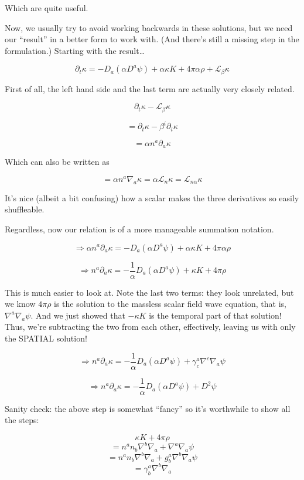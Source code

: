 \documentclass[landscape,letterpaper,10pt,english]{article}
\begin{document}
    Which are quite useful.

Now, we usually try to avoid working backwards in these solutions, but
we need our ``result'' in a better form to work with. (And there's still
a missing step in the formulation.) Starting with the result\ldots{}

\[ \partial_t \kappa = -D_a(\alpha D^a \psi) + \alpha \kappa K + 4\pi \alpha\rho + \mathcal{L}_\beta \kappa \]

First of all, the left hand side and the last term are actually very
closely related.

\[ \partial_t \kappa - \mathcal{L}_\beta \kappa \]

\[ = \partial_t \kappa - \beta^i \partial_i \kappa \]

\[ = \alpha n^a \partial_a \kappa \]

Which can also be written as

\[ = \alpha n^a \nabla_a \kappa = \alpha \mathcal{L}_n \kappa = \mathcal{L}_{n\alpha} \kappa\]

It's nice (albeit a bit confusing) how a scalar makes the three
derivatives so easily shuffleable.

    Regardless, now our relation is of a more manageable summation notation.

\[ \Rightarrow \alpha n^a \partial_a \kappa = -D_a(\alpha D^a \psi) + \alpha \kappa K + 4\pi \alpha\rho \]

\[ \Rightarrow n^a \partial_a \kappa = -\frac{1}{\alpha} D_a(\alpha D^a \psi) + \kappa K + 4 \pi \rho \]

This is much easier to look at. Note the last two terms: they look
unrelated, but we know \(4 \pi \rho\) is the solution to the massless
scalar field wave equation, that is, \(\nabla^a \nabla_a \psi\). And we
just showed that \(-\kappa K\) is the temporal part of that solution!
Thus, we're subtracting the two from each other, effectively, leaving us
with only the SPATIAL solution!

\[ \Rightarrow n^a \partial_a \kappa = -\frac{1}{\alpha} D_a(\alpha D^a \psi) + \gamma^a_c \nabla^c \nabla_a \psi \]

\[ \Rightarrow n^a \partial_a \kappa = -\frac{1}{\alpha} D_a(\alpha D^a \psi) + D^2 \psi \]

    Sanity check: the above step is somewhat ``fancy'' so it's worthwhile to
show all the steps:

\[ \kappa K + 4 \pi \rho \]
\[ = n^an_b\nabla^b\nabla_a + \nabla^a \nabla_a \psi \]
\[ = n^an_b\nabla^b\nabla_a + g^a_b \nabla^b \nabla_a \psi \]
\[ = \gamma^a_b \nabla^b\nabla_a \]
\end{document}
